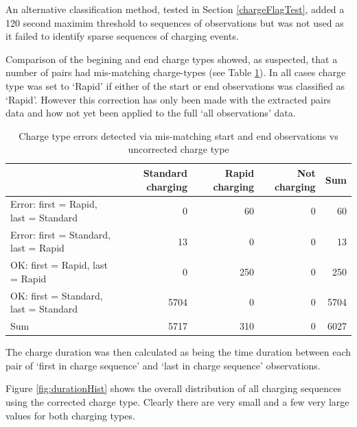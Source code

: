 \documentclass[]{article}
\begin{document}
An alternative classification method, tested in Section \ref{chargeFlagTest}, added a 120 second maximim threshold to sequences of observations but was not used as it failed to identify sparse sequences of charging events.

Comparison of the begining and end charge types showed, as suspected, that a number of pairs had mis-matching charge-types (see Table \ref{tab:checkChargeTypeErrors}). In all cases charge type was set to `Rapid' if either of the start or end observations was classified as `Rapid'. However this correction has only been made with the extracted pairs data and how not yet been applied to the full `all observations' data.

\begin{table}[t]

\caption{\label{tab:checkChargeTypeErrors}Charge type errors detected via mis-matching start and end observations vs uncorrected charge type}
\centering
\begin{tabular}{l|r|r|r|r}
\hline
  & Standard charging & Rapid charging & Not charging & Sum\\
\hline
Error: first = Rapid, last = Standard & 0 & 60 & 0 & 60\\
\hline
Error: first = Standard, last = Rapid & 13 & 0 & 0 & 13\\
\hline
OK: first = Rapid, last = Rapid & 0 & 250 & 0 & 250\\
\hline
OK: first = Standard, last = Standard & 5704 & 0 & 0 & 5704\\
\hline
Sum & 5717 & 310 & 0 & 6027\\
\hline
\end{tabular}
\end{table}

The charge duration was then calculated as being the time duration between each pair of `first in charge sequence' and `last in charge sequence' observations.

Figure \ref{fig:durationHist} shows the overall distribution of all charging sequences using the corrected charge type. Clearly there are very small and a few very large values for both charging types.
\end{document}
